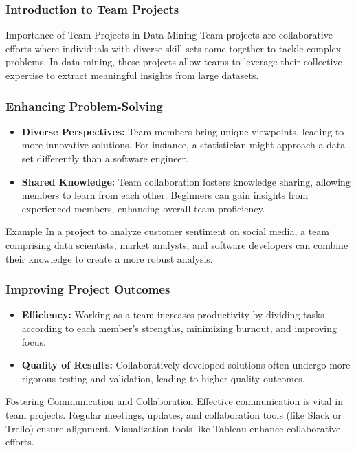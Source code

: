 \documentclass[aspectratio=169]{beamer}
\begin{document}
\frame{\titlepage}

\begin{frame}[fragile]
    \frametitle{Introduction to Team Projects}
    \begin{block}{Importance of Team Projects in Data Mining}
        Team projects are collaborative efforts where individuals with diverse skill sets come together to tackle complex problems. In data mining, these projects allow teams to leverage their collective expertise to extract meaningful insights from large datasets.
    \end{block}
\end{frame}

\begin{frame}[fragile]
    \frametitle{Enhancing Problem-Solving}
    \begin{itemize}
        \item \textbf{Diverse Perspectives:} Team members bring unique viewpoints, leading to more innovative solutions. For instance, a statistician might approach a data set differently than a software engineer.
        \item \textbf{Shared Knowledge:} Team collaboration fosters knowledge sharing, allowing members to learn from each other. Beginners can gain insights from experienced members, enhancing overall team proficiency.
    \end{itemize}
    \begin{block}{Example}
        In a project to analyze customer sentiment on social media, a team comprising data scientists, market analysts, and software developers can combine their knowledge to create a more robust analysis.
    \end{block}
\end{frame}

\begin{frame}[fragile]
    \frametitle{Improving Project Outcomes}
    \begin{itemize}
        \item \textbf{Efficiency:} Working as a team increases productivity by dividing tasks according to each member's strengths, minimizing burnout, and improving focus.
        \item \textbf{Quality of Results:} Collaboratively developed solutions often undergo more rigorous testing and validation, leading to higher-quality outcomes.
    \end{itemize}
    \begin{block}{Fostering Communication and Collaboration}
        Effective communication is vital in team projects. Regular meetings, updates, and collaboration tools (like Slack or Trello) ensure alignment. Visualization tools like Tableau enhance collaborative efforts.
    \end{block}
\end{frame}
\end{document}
